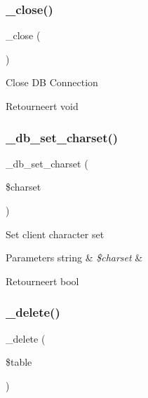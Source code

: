 \subsubsection{\texorpdfstring{\_close()}{\_close()}}
{\footnotesize\ttfamily \+\_\+close (\begin{DoxyParamCaption}{ }\end{DoxyParamCaption})\hspace{0.3cm}{\ttfamily [protected]}}

Close DB Connection

\begin{DoxyReturn}{Retourneert}
void 
\end{DoxyReturn}
\mbox{\label{class_c_i___d_b__mssql__driver_a2b808d420d8e9fea0b73ad7127f5efb8}} 
\subsubsection{\texorpdfstring{\_db\_set\_charset()}{\_db\_set\_charset()}}
{\footnotesize\ttfamily \+\_\+db\+\_\+set\+\_\+charset (\begin{DoxyParamCaption}\item[{}]{\$charset }\end{DoxyParamCaption})\hspace{0.3cm}{\ttfamily [protected]}}

Set client character set


\begin{DoxyParams}[1]{Parameters}
string & {\em \$charset} & \\
\hline
\end{DoxyParams}
\begin{DoxyReturn}{Retourneert}
bool 
\end{DoxyReturn}
\mbox{\label{class_c_i___d_b__mssql__driver_a133ea8446ded52589bd22cc9163d0896}} 
\subsubsection{\texorpdfstring{\_delete()}{\_delete()}}
{\footnotesize\ttfamily \+\_\+delete (\begin{DoxyParamCaption}\item[{}]{\$table }\end{DoxyParamCaption})\hspace{0.3cm}{\ttfamily [protected]}}


